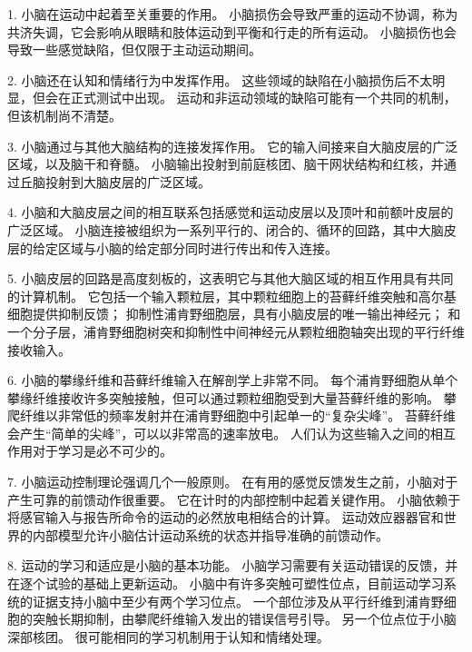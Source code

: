 1. 小脑在运动中起着至关重要的作用。
小脑损伤会导致严重的运动不协调，称为共济失调，它会影响从眼睛和肢体运动到平衡和行走的所有运动。
小脑损伤也会导致一些感觉缺陷，但仅限于主动运动期间。


2. 小脑还在认知和情绪行为中发挥作用。
这些领域的缺陷在小脑损伤后不太明显，但会在正式测试中出现。
运动和非运动领域的缺陷可能有一个共同的机制，但该机制尚不清楚。


3. 小脑通过与其他大脑结构的连接发挥作用。
它的输入间接来自大脑皮层的广泛区域，以及脑干和脊髓。
小脑输出投射到前庭核团、脑干网状结构和红核，并通过丘脑投射到大脑皮层的广泛区域。


4. 小脑和大脑皮层之间的相互联系包括感觉和运动皮层以及顶叶和前额叶皮层的广泛区域。
小脑连接被组织为一系列平行的、闭合的、循环的回路，其中大脑皮层的给定区域与小脑的给定部分同时进行传出和传入连接。


5. 小脑皮层的回路是高度刻板的，这表明它与其他大脑区域的相互作用具有共同的计算机制。
它包括一个输入颗粒层，其中颗粒细胞上的苔藓纤维突触和高尔基细胞提供抑制反馈；
抑制性浦肯野细胞层，具有小脑皮层的唯一输出神经元；
和一个分子层，浦肯野细胞树突和抑制性中间神经元从颗粒细胞轴突出现的平行纤维接收输入。


6. 小脑的攀缘纤维和苔藓纤维输入在解剖学上非常不同。
每个浦肯野细胞从单个攀缘纤维接收许多突触接触，但可以通过颗粒细胞受到大量苔藓纤维的影响。
攀爬纤维以非常低的频率发射并在浦肯野细胞中引起单一的“复杂尖峰”。
苔藓纤维会产生“简单的尖峰”，可以以非常高的速率放电。
人们认为这些输入之间的相互作用对于学习是必不可少的。


7. 小脑运动控制理论强调几个一般原则。
在有用的感觉反馈发生之前，小脑对于产生可靠的前馈动作很重要。
它在计时的内部控制中起着关键作用。
小脑依赖于将感官输入与报告所命令的运动的必然放电相结合的计算。
运动效应器器官和世界的内部模型允许小脑估计运动系统的状态并指导准确的前馈动作。


8. 运动的学习和适应是小脑的基本功能。
小脑学习需要有关运动错误的反馈，并在逐个试验的基础上更新运动。
小脑中有许多突触可塑性位点，目前运动学习系统的证据支持小脑中至少有两个学习位点。
一个部位涉及从平行纤维到浦肯野细胞的突触长期抑制，由攀爬纤维输入发出的错误信号引导。
另一个位点位于小脑深部核团。
很可能相同的学习机制用于认知和情绪处理。



